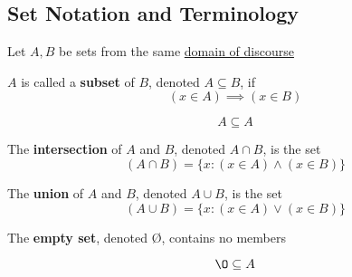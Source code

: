 \subsection{Set Notation and Terminology}
Let $A,B$ be sets from the same \hyperref[def:domain-of-discourse]{domain of discourse}
\begin{definition}[Subset]\label{def:subset}
    $A$ is called a \textbf{subset} of $B$, denoted $A \subseteq B$, if
    \[
    (x \in A) \implies (x \in B)
    \]
\end{definition}
\begin{note}
    \[
    A \subseteq A
    \]
    
\end{note}
\begin{definition}[Intersection]\label{def:intersection}
    The \textbf{intersection} of $A$ and $B$, denoted $A \cap B$, is the set
    \[
    (A \cap B) = \{x:(x \in A) \land (x \in B)\}
    \]
\end{definition}
\begin{definition}[Union]\label{def:union}
    The \textbf{union} of $A$ and $B$, denoted $A \cup B$, is the set
    \[
    (A \cup B)=\{x:(x \in A)\lor (x \in B)\}
    \]
\end{definition}
\begin{notation}
    The \textbf{empty set}, denoted \O, contains no members
\end{notation}
\begin{note}
        \[
        \O \subseteq A
        \]
\end{note}

